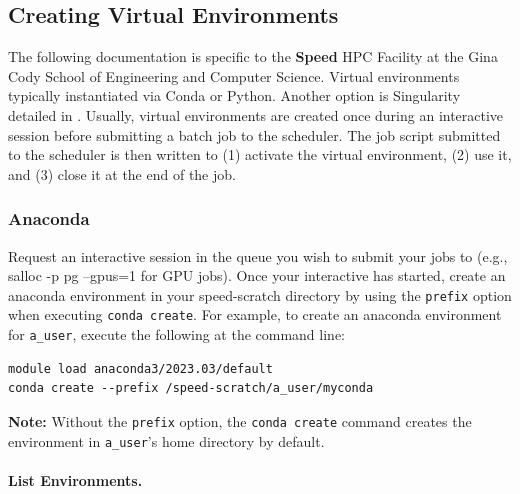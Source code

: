 \documentclass{easychair}
\begin{document}
\subsection{Creating Virtual Environments}
\label{sect:environments}
\label{sect:examples-venv}

The following documentation is specific to the \textbf{Speed} HPC Facility at the
Gina Cody School of Engineering and Computer Science.
%
Virtual environments typically instantiated via Conda or Python.
Another option is Singularity detailed in .
%
Usually, virtual environments are created once during an interactive session before submitting
a batch job to the scheduler. The job script submitted to the scheduler is then written to 
(1) activate the virtual environment, (2) use it, and (3) close it at the end of the job.

\subsubsection{Anaconda}
\label{sect:conda-venv}

Request an interactive session in the queue you wish to submit your jobs to (e.g., salloc -p pg --gpus=1 for GPU jobs).
Once your interactive has started, create an anaconda environment in your speed-scratch directory by using 
the \texttt{\-\-prefix} option when executing \texttt{conda create}. For example, to create an anaconda environment for 
\texttt{a\_user}, execute the following at the command line:

\begin{verbatim}
module load anaconda3/2023.03/default
conda create --prefix /speed-scratch/a_user/myconda
\end{verbatim}

\vspace{10pt}
\noindent
\textbf{Note:} Without the \texttt{\-\-prefix} option, the \texttt{conda create} command creates the 
environment in \texttt{a\_user}'s home directory by default.
\vspace{10pt}

\paragraph{List Environments.}
\end{document}
